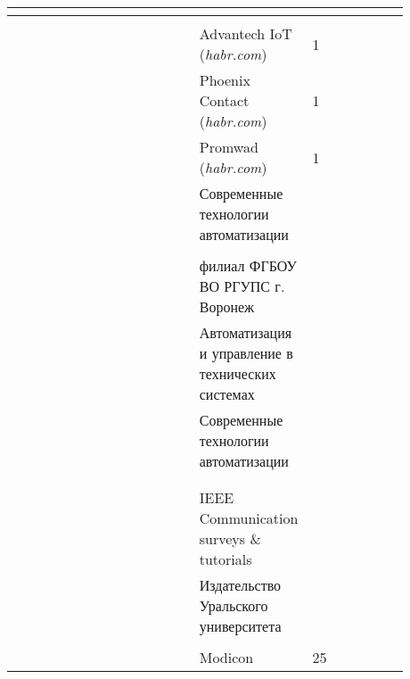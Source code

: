 \begin{center}
\begin{longtable}{|C{0.13\linewidth}|C{0.35\linewidth}|C{0.15\linewidth}|C{0.1\linewidth}|C{0.15\linewidth}|}
		\hline
		\gs &&&&\cite{van_gorp_advanced_2009}\\
		\hline
		\gs &&&&\cite{_modbus_2021}\\
		\hline
		\g &&Advantech IoT (\textit{habr.com})&1&\cite{advantech__2019}\\
		\hline
		\g && Phoenix Contact (\textit{habr.com})&1&\cite{phoenix_contact__2020}\\
		\hline
		\g && Promwad (\textit{habr.com})&1&\cite{promwad__2019}\\
		\hline
		\gs &&Современ\-ные технологии автоматизации&&\cite{__2010}\\
		\hline
		\gs &&&&\cite{daneels_what_1999}\\
		\hline
		\gs &&филиал ФГБОУ ВО РГУПС г. Воронеж&&\cite{__2019}\\
		\hline
		\gs &&Автомати\-зация и управление в технических системах&&\cite{__2013-1}\\
		\hline
		\gs &&Современ\-ные технологии автоматизации&&\cite{__1998}\\
		\hline
		\gs &&&&\cite{__2013}\\
		\hline
		\gs &&&&\cite{__2017}\\
		\hline
		\gs &&IEEE Communi\-cation surveys \& tutorials&&\cite{galloway_introduction_2012}\\
		\hline
		\gs &&Издательст\-во Уральского университета&&\cite{__2020}\\
		\hline
		\gs &&&&\cite{a_design_2020}\\
		\hline
		\gs &&Modicon& 25&\cite{swales_open_1999}\\

\end{longtable}
\end{center}
